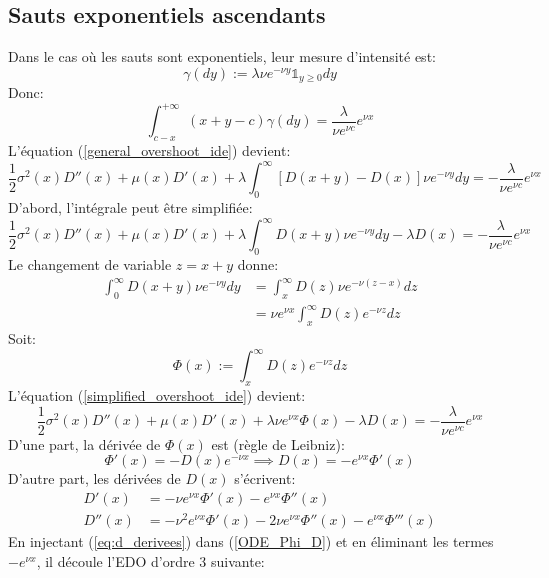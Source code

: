 \subsection{Sauts exponentiels ascendants}
Dans le cas où les sauts sont exponentiels, leur mesure d'intensité est:
\[
\gamma(dy):=\lambda\nu e^{-\nu y}\mathds{1}_{y\geq0}dy
\]
Donc:
\[
\int_{c-x}^{+\infty}(x+y-c)\gamma(dy)=\frac{\lambda}{\nu e^{\nu c}}e^{\nu x}
\]
L'équation (\ref{general_overshoot_ide}) devient:
\begin{equation}\label{initial_overshoot_ide}
    \frac{1}{2}\sigma^2(x)D''(x)+\mu(x)D'(x)+\lambda\int_0^\infty[D(x+y)-D(x)]\nu e^{-\nu y}dy=-\frac{\lambda}{\nu e^{\nu c}}e^{\nu x}
\end{equation}
D'abord, l'intégrale peut être simplifiée: 
\begin{equation}\label{simplified_overshoot_ide}
    \frac{1}{2}\sigma^2(x)D''(x)+\mu(x)D'(x)+\lambda\int_0^\infty D(x+y)\nu e^{-\nu y}dy-\lambda D(x)=-\frac{\lambda}{\nu e^{\nu c}}e^{\nu x}
\end{equation}
Le changement de variable $z=x+y$ donne:
\[
\begin{aligned}
    \int_0^\infty D(x+y)\nu e^{-\nu y}dy&=\int_x^\infty D(z)\nu e^{-\nu(z-x)}dz\\
    &=\nu e^{\nu x}\int_x^\infty D(z)e^{-\nu z}dz
\end{aligned}
\]
Soit:
\[
\Phi(x):=\int_x^\infty D(z)e^{-\nu z}dz
\]
L'équation (\ref{simplified_overshoot_ide}) devient:
\begin{equation}\label{ODE_Phi_D}
    \frac{1}{2}\sigma^2(x)D''(x)+\mu(x)D'(x)+\lambda\nu e^{\nu x}\Phi(x)-\lambda D(x)=-\frac{\lambda}{\nu e^{\nu c}}e^{\nu x}
\end{equation}
D'une part, la dérivée de $\Phi(x)$ est (règle de Leibniz):
\begin{equation}\label{Leibniz_rule}
    \Phi'(x)=-D(x)e^{-\nu x}\implies D(x)=-e^{\nu x }\Phi'(x)
\end{equation}
D'autre part, les dérivées de $D(x)$ s'écrivent: 
\begin{equation}\label{eq:d_derivees}
    \begin{aligned}
        D'(x) &= -\nu e^{\nu x}\Phi'(x)-e^{\nu x}\Phi''(x) \\
        D''(x)&= -\nu^2e^{\nu x}\Phi'(x)-2\nu e^{\nu x}\Phi''(x)-e^{\nu x}\Phi'''(x)
    \end{aligned}
\end{equation}
En injectant (\ref{eq:d_derivees}) dans (\ref{ODE_Phi_D}) et en éliminant les termes $-e^{\nu x}$, il découle l'\acs{EDO} d'ordre 3 suivante: 
